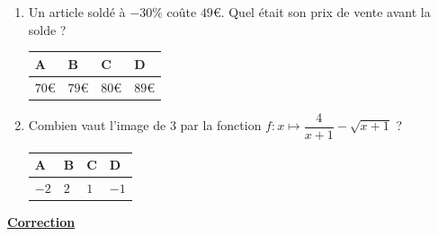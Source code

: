 \documentclass[oneside,12pt]{exam}          %
\begin{document}
\begin{enumerate}[label=\underline{Question \no\arabic*} :  , leftmargin=* , itemsep=5mm]
		

	\item Un article soldé à $-30\%$ coûte $49$\euro. Quel était son prix de vente avant la solde ?
	
		\hspace{\linewidth-\textwidth}
		\renewcommand{\arraystretch}{1.5}
		\begin{tabular}{| P{0.22\textwidth} | P{0.22\textwidth} | P{0.22\textwidth} | P{0.22\textwidth} |} \hline
			A & B & C & D \\ \hline
			$70$\euro & $79$\euro & $80$\euro & $89$\euro \\ \hline
		\end{tabular}
		
		
		

	\item Combien vaut l'image de $3$ par la fonction $f : x \mapsto \dfrac{4}{x+1} - \sqrt{x+1}$ \; ?
	
		\hspace{\linewidth-\textwidth}
		\renewcommand{\arraystretch}{1.5}
		\begin{tabular}{| P{0.22\textwidth} | P{0.22\textwidth} | P{0.22\textwidth} | P{0.22\textwidth} |} \hline
			A & B & C & D \\ \hline
			$-2$ & $2$ & $1$ & $-1$ \\ \hline
		\end{tabular}	
		
\end{enumerate}




\newpage
{}
\color{newblue}

\begin{center}
	\textbf{\underline{\Large Correction} }
\end{center}
\end{document}
